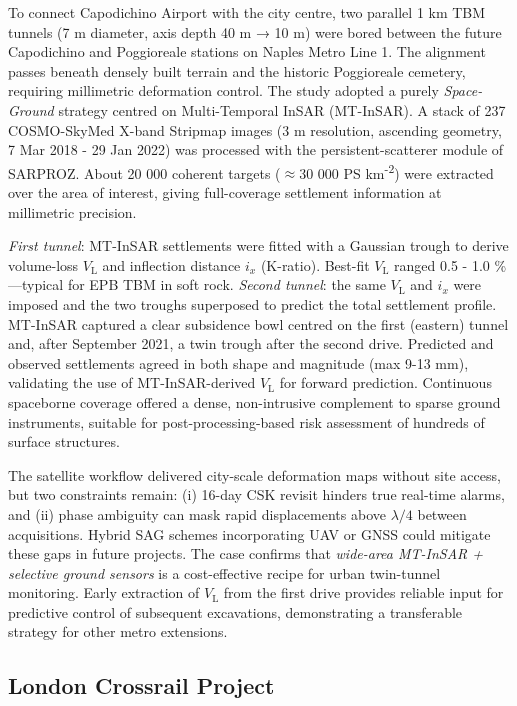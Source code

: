 \documentclass[preprint,11pt,authoryear,3p]{elsarticle}
\begin{document}
To connect Capodichino Airport with the city centre, two parallel 1 km TBM tunnels (7 m diameter, axis depth 40 m → 10 m) were bored between the future Capodichino and Poggioreale stations on Naples Metro Line 1. The alignment passes beneath densely built terrain and the historic Poggioreale cemetery, requiring millimetric deformation control.
The study adopted a purely \emph{Space-Ground} strategy centred on Multi-Temporal InSAR (MT-InSAR). A stack of 237 COSMO-SkyMed X-band Stripmap images (3 m resolution, ascending geometry, 7 Mar 2018 - 29 Jan 2022) was processed with the persistent-scatterer module of SARPROZ. About 20 000 coherent targets ($\approx$30 000 PS km\textsuperscript{-2}) were extracted over the area of interest, giving full-coverage settlement information at millimetric precision.

\emph{First tunnel}: MT-InSAR settlements were fitted with a Gaussian trough to derive volume-loss $V_\mathrm{L}$ and inflection distance $i_x$ (K-ratio). Best-fit $V_\mathrm{L}$ ranged 0.5 - 1.0 \%—typical for EPB TBM in soft rock. \emph{Second tunnel}: the same $V_\mathrm{L}$ and $i_x$ were imposed and the two troughs superposed to predict the total settlement profile. MT-InSAR captured a clear subsidence bowl centred on the first (eastern) tunnel and, after September 2021, a twin trough after the second drive. Predicted and observed settlements agreed in both shape and magnitude (max 9-13 mm), validating the use of MT-InSAR-derived $V_\mathrm{L}$ for forward prediction. Continuous spaceborne coverage offered a dense, non-intrusive complement to sparse ground instruments, suitable for post-processing-based risk assessment of hundreds of surface structures.

The satellite workflow delivered city-scale deformation maps without site access, but two constraints remain: (i) 16-day CSK revisit hinders true real-time alarms, and (ii) phase ambiguity can mask rapid displacements above $\lambda/4$ between acquisitions. Hybrid SAG schemes incorporating UAV or GNSS could mitigate these gaps in future projects. The case confirms that \emph{wide-area MT-InSAR + selective ground sensors} is a cost-effective recipe for urban twin-tunnel monitoring. Early extraction of $V_\mathrm{L}$ from the first drive provides reliable input for predictive control of subsequent excavations, demonstrating a transferable strategy for other metro extensions.

\subsection{London Crossrail Project}
\end{document}
